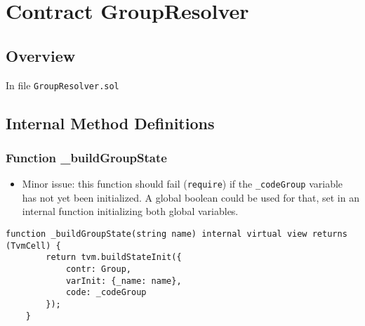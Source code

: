 
\chapter{Contract GroupResolver}

\minitoc

\section{Overview}


In file {\tt GroupResolver.sol}

\section{Internal Method Definitions}


\subsection{Function \_{}buildGroupState}

\begin{itemize}
\item Minor issue: this function should fail ({\tt require}) if the
  {\tt \_codeGroup} variable has not yet been initialized. A global
  boolean could be used for that, set in an internal function
  initializing both global variables.
\end{itemize}

\begin{lstlisting}[firstnumber=16]
    function _buildGroupState(string name) internal virtual view returns (TvmCell) {
        return tvm.buildStateInit({
            contr: Group,
            varInit: {_name: name},
            code: _codeGroup
        });
    }
\end{lstlisting}
